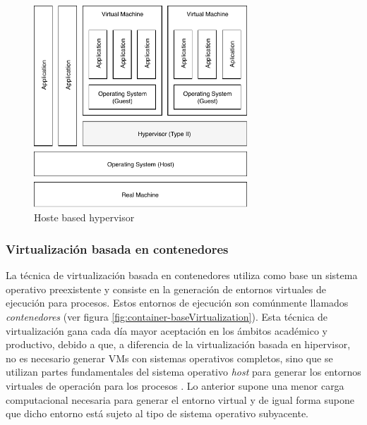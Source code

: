 \begin{figure}[ht] %
	\centering
	\includegraphics[width=8cm]{Pictures/host-basedHypervisor.pdf}
	\vspace{-0.2cm}
	\caption{Hoste based hypervisor}
	\label{fig:host-basedHypervisor}
\end{figure}

\subsubsection{Virtualización basada en contenedores}
\vspace{5mm}
La técnica de virtualización basada en contenedores utiliza como base un sistema operativo preexistente y consiste en la generación de entornos virtuales de ejecución para procesos. Estos entornos de ejecución son comúnmente llamados \textit{contenedores} (ver figura \ref{fig:container-baseVirtualization}). Esta técnica de virtualización gana cada día mayor aceptación en los ámbitos académico y productivo, debido a que, a diferencia de la virtualización basada en hipervisor, no es necesario generar VMs con sistemas operativos completos, sino que se utilizan partes fundamentales del sistema operativo \textit{host} para generar los entornos virtuales de operación para los procesos \parencite{Kon2017}. Lo anterior supone una menor carga computacional necesaria para generar el entorno virtual y de igual forma supone que dicho entorno está sujeto al tipo de sistema operativo subyacente. 


